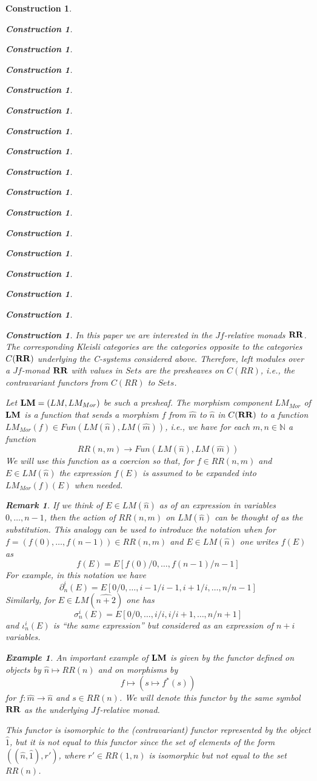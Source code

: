 \documentclass[12pt]{amsart}
\newtheorem{example}[proposition]{Example}
\newtheorem{remark}[proposition]{Remark}
\numberwithin{proposition}{subsection}
\newtheorem{construction}[proposition]{Construction}
\newcommand{\llabel}[1]{\label{#1}}
\newcommand{\sr}{\rightarrow}
\newcommand{\nn}{{\mathbb N}}
\newcommand{\nat}{\nn}
\newcommand{\wh}{\widehat}
\newcommand{\mbind}[1]{{#1^*}}
\newcommand{\RR}{{\bf RR}}
\newcommand{\LM}{{\bf LM}}
\begin{document}
\begin{construction}
\begin{construction}
\begin{construction}
\begin{construction}
\begin{construction}
\begin{construction}
\begin{construction}
\begin{construction}
\begin{construction}
\begin{construction}
\begin{construction}
\begin{construction}
\begin{construction}
\begin{construction}
\begin{construction}
\begin{construction}
\begin{construction}
In this paper we are interested in the $Jf$-relative monads $\RR$. The
corresponding Kleisli categories are the categories opposite to the categories
$C(\RR)$ underlying the C-systems considered above. Therefore, left modules
over a $Jf$-monad $\RR$ with values in $Sets$ are the presheaves on $C(RR)$,
i.e., the contravariant functors from $C(RR)$ to $Sets$.

Let $\LM=(LM,LM_{Mor})$ be such a presheaf.
%
%
The morphism component $LM_{Mor}$ of $\LM$ is a function that sends a morphism
$f$ from $\wh{m}$ to $\wh{n}$ in $C(\RR)$ to a function $LM_{Mor}(f)\in
Fun(LM(\wh{n}),LM(\wh{m}))$, i.e., we have for each $m,n\in\nat$ a function
%
$$RR(n,m)\sr Fun(LM(\wh{n}),LM(\wh{m}))$$
%
%
We will use this function as a coercion so that, for $f\in RR(n,m)$ and $E\in
LM(\wh{n})$ the expression $f(E)$ is assumed to be expanded into
$LM_{Mor}(f)(E)$ when needed.
%
\begin{remark}\rm
\llabel{2015.08.18.rem1} 
If we think of $E\in LM(\wh{n})$ as of an expression
in variables $0,\dots,n-1$, then the action of $RR(n,m)$ on $LM(\wh{n})$ can be
thought of as the substitution. This analogy can be used to introduce the
notation when for $f=(f(0),\dots,f(n-1))\in RR(n,m)$ and $E\in LM(\wh{n})$ one
writes $f(E)$ as
%
$$f(E)=E[f(0)/0,\dots,f(n-1)/n-1]$$
%
For example, in this notation we have 
%
$$\partial^i_n(E)=E[0/0,\dots,i-1/i-1,i+1/i,\dots,n/n-1]$$
%
Similarly, for $E\in LM(\wh{n+2})$ one has
%
$$\sigma^i_n(E)=E[0/0,\dots,i/i,i/i+1,\dots,n/n+1]$$
%
and $\iota_n^i(E)$ is ``the same expression'' but considered as an expression of $n+i$ variables.
\end{remark}
%
\begin{example}\rm
\llabel{2015.09.07.rem3} 
An important example of $\LM$ is given by the functor
defined on objects by $\wh{n}\mapsto RR(n)$ and on morphisms by
%
$$f\mapsto (s\mapsto\mbind{f}(s))$$
%
for $f:\wh{m}\sr \wh{n}$ and $s\in RR(n)$. We will denote this functor by the
same symbol $\RR$ as the underlying $Jf$-relative monad.

This functor is isomorphic to the (contravariant) functor represented by the
object $\wh{1}$, but it is not equal to this functor since the set of elements
of the form $((\wh{n},\wh{1}),r')$, where $r'\in RR(1,n)$ is isomorphic but not
equal to the set $RR(n)$.
\end{example}


\end{construction}
\end{construction}
\end{construction}
\end{construction}
\end{construction}
\end{construction}
\end{construction}
\end{construction}
\end{construction}
\end{construction}
\end{construction}
\end{construction}
\end{construction}
\end{construction}
\end{construction}
\end{construction}
\end{construction}
\end{document}
